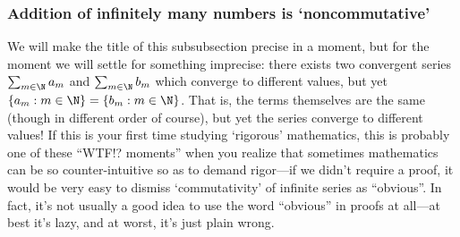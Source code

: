 \subsubsection{Addition of infinitely many numbers is `noncommutative'}

We will make the title of this subsubsection precise in a moment, but for the moment we will settle for something imprecise:  there exists two convergent series $\sum _{m\in \N}a_m$ and $\sum _{m\in \N}b_m$ which converge to different values, but yet $\{ a_m:m\in \N \} =\{ b_m:m\in \N \}$.  That is, the terms themselves are the same (though in different order of course), but yet the series converge to different values!  If this is your first time studying `rigorous' mathematics, this is probably one of these ``WTF!? moments'' when you realize that sometimes mathematics can be so counter-intuitive so as to demand rigor---if we didn't require a proof, it would be very easy to dismiss `commutativity' of infinite series as ``obvious''.  In fact, it's not usually a good idea to use the word ``obvious'' in proofs at all---at best it's lazy, and at worst, it's just plain wrong.

